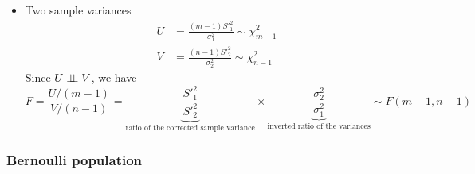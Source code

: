 \begin{itemize}
    \item Two sample variances
        \begin{align*}
            U & = \frac{(m-1)S'^2_1}{\sigma_1^2} \sim \chi^2_{m-1}\\
            V & = \frac{(n-1)S'^2_2}{\sigma_2^2} \sim \chi^2_{n-1}
        \end{align*}
        Since $ U\perp\!\!\!\perp V$, we have
        \begin{equation*}
            F = \frac{U/(m-1)}{V/(n-1)} = \underbrace{\frac{S'^2_1}{S'^2_2}}_{\text{ratio of the corrected sample variance}}\times\underbrace{\frac{\sigma^2_2}{\sigma^2_1}}_{\text{inverted ratio of the variances}} \sim F(m-1,n-1)
        \end{equation*}
\end{itemize}

\subsubsection{Bernoulli population}

